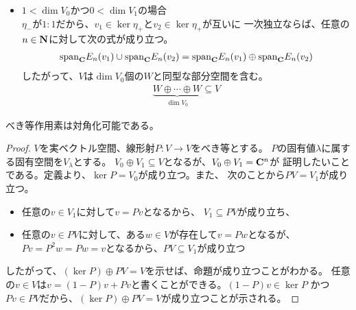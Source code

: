 {\begin{itemize}
		$V$が無限次元となることがわかる。そして、$W$が$\fukuso\B_1$の既約表現
		となることがわかる。
		図にすると次のようになる。
		\begin{equation*}\begin{split}
			0 \xfrom{\eta_+} v \tofrom{\eta_-}{\eta_+} 
			\eta_-v \tofrom{\eta_-}{\eta_+}
			\eta_-^2v \tofrom{\eta_-}{\eta_+}
			\cdots
		\end{split}\end{equation*}
		\item $1<\dim V_0$かつ$0<\dim V_1$の場合 \\
		$\eta_-$が$1:1$だから、$v_1\in\ker\eta_+$と$v_2\in\ker\eta_+$が互いに
		一次独立ならば、任意の$n\in\mathbf{N}$に対して次の式が成り立つ。
		\begin{equation*}\begin{split}
			{\ensuremath{\operatorname{span}}}_{\mathbf{C}} E_n(v_1) \cup {\ensuremath{\operatorname{span}}}_{\mathbf{C}} E_n(v_2)
			= {\operatorname{span}}_{\mathbf{C}} E_n(v_1) \oplus {\ensuremath{\operatorname{span}}}_{\mathbf{C}} E_n(v_2)
		\end{split}\end{equation*}
		したがって、$V$は$\dim V_0$個の$W$と同型な部分空間を含む。
		\begin{equation*}\begin{split}
			\underbrace{W\oplus\cdots\oplus W}_{\dim V_0}\subseteq V
		\end{split}\end{equation*}
	\end{itemize} %

	\begin{proposition}[べき等作用素の対角化]\label{prop:べき等作用素の対角化} %
		べき等作用素は対角化可能である。
	\end{proposition} %
	\begin{proof} %
		$V$を実ベクトル空間、線形射$P:V\to V$をべき等とする。
		$P$の固有値$\lambda$に属する固有空間を$V_\lambda$とする。
		$V_0\oplus V_1\subseteq V$となるが、$V_0\oplus V_1=\mathbf{C}^n$が
		証明したいことである。定義より、$\ker P=V_0$が成り立つ。また、
		次のことから$PV=V_1$が成り立つ。
		\begin{itemize}\setlength{\itemsep}{-1mm} %
			\item 任意の$v\in V_1$に対して$v=Pv$となるから、
			$V_1\subseteq PV$が成り立ち、
			\item 任意の$v\in PV$に対して、ある$w\in V$が存在して$v=Pw$となるが、
			$Pv=P^2w=Pw=v$となるから、$PV\subseteq V_1$が成り立つ
		\end{itemize} %
		したがって、$(\ker P)\oplus PV=V$を示せば、命題が成り立つことがわかる。
		任意の$v\in V$は$v=(1-P)v + Pv$と書くことができる。$(1-P)v\in\ker P$
		かつ$Pv\in PV$だから、$(\ker P)\oplus PV=V$が成り立つことが示される。
	\end{proof} %

}
